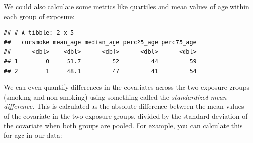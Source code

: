 \documentclass[
]{book}
\newenvironment{Shaded}{\begin{snugshade}}{\end{snugshade}}
\newcommand{\DataTypeTok}[1]{\textcolor[rgb]{0.13,0.29,0.53}{#1}}
\newcommand{\DecValTok}[1]{\textcolor[rgb]{0.00,0.00,0.81}{#1}}
\newcommand{\FloatTok}[1]{\textcolor[rgb]{0.00,0.00,0.81}{#1}}
\newcommand{\KeywordTok}[1]{\textcolor[rgb]{0.13,0.29,0.53}{\textbf{#1}}}
\newcommand{\NormalTok}[1]{#1}
\newcommand{\OperatorTok}[1]{\textcolor[rgb]{0.81,0.36,0.00}{\textbf{#1}}}
\newcommand{\StringTok}[1]{\textcolor[rgb]{0.31,0.60,0.02}{#1}}
\begin{document}
We could also calculate some metrics like quartiles and mean values of age within each group of exposure:

\begin{Shaded}
\end{Shaded}

\begin{verbatim}
## # A tibble: 2 x 5
##   cursmoke mean_age median_age perc25_age perc75_age
##      <dbl>    <dbl>      <dbl>      <dbl>      <dbl>
## 1        0     51.7         52         44         59
## 2        1     48.1         47         41         54
\end{verbatim}

We can even quantify differences in the covariates across the two exposure groups (smoking and non-smoking) using something called the \emph{standardized mean difference}. This is calculated as the absolute difference between the mean values of the covariate in the two exposure groups, divided by the standard deviation of the covariate when both groups are pooled. For example, you can calculate this for age in our data:

\begin{Shaded}
\end{Shaded}
\end{document}
